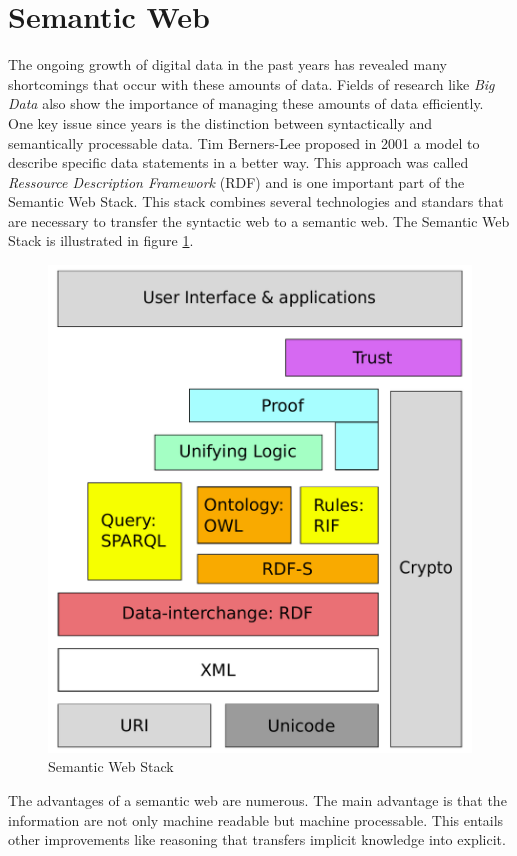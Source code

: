 \section{Semantic Web}
\label{sec:semantic-web}
The ongoing growth of digital data in the past years has revealed many shortcomings that occur with these amounts of data.
Fields of research like \textit{Big Data} also show the importance of managing these amounts of data efficiently.
One key issue since years is the distinction between syntactically and semantically processable data.
Tim Berners-Lee proposed in 2001 a model to describe specific data statements in a better way.
This approach was called \textit{Ressource Description Framework} (RDF) and is one important part of the Semantic Web Stack.
This stack combines several technologies and standars that are necessary to transfer the syntactic web to a semantic web.
The Semantic Web Stack is illustrated in figure \ref{fig:sem_stack}.
\begin{figure}
  \centering
  \includegraphics[scale=0.3]{preliminaries/semweb_stack}
  \caption{Semantic Web Stack}
  \label{fig:sem_stack}
\end{figure}
The advantages of a semantic web are numerous.
The main advantage is that the information are not only machine readable but machine processable.
This entails other improvements like reasoning that transfers implicit knowledge into explicit.


